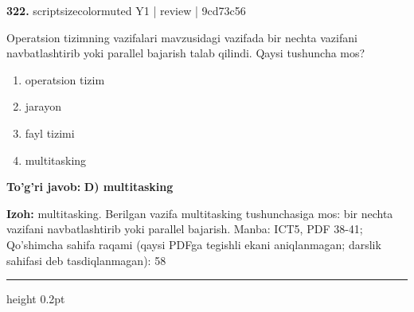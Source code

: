 \documentclass[10pt,a4paper]{article}
\begin{document}
{\bfseries\sffamily\color{ink} 322.} {scriptsizecolor{muted} Y1 | review | 9cd73c56}
\par
Operatsion tizimning vazifalari mavzusidagi vazifada bir nechta vazifani navbatlashtirib yoki parallel bajarish talab qilindi. Qaysi tushuncha mos?
\begin{enumerate}[label=\Alph*),leftmargin=9mm]
\item operatsion tizim
\item jarayon
\item fayl tizimi
\item multitasking
\end{enumerate}
\begin{tcolorbox}[enhanced,breakable,colback=teal!4,colframe=teal!60!black,boxrule=0.45pt,arc=1.2mm,left=2.7mm,right=2.7mm,top=1.8mm,bottom=1.8mm,before skip=2mm,after skip=2mm]
{\bfseries\sffamily\color{teal}To'g'ri javob:} \textbf{D) multitasking}
\par\smallskip
{\bfseries Izoh:} multitasking. Berilgan vazifa multitasking tushunchasiga mos: bir nechta vazifani navbatlashtirib yoki parallel bajarish. Manba: ICT5, PDF 38-41; Qo'shimcha sahifa raqami (qaysi PDFga tegishli ekani aniqlanmagan; darslik sahifasi deb tasdiqlanmagan): 58
\end{tcolorbox}
\vspace{2mm}\hrule height 0.2pt\vspace{3mm}
\end{document}

